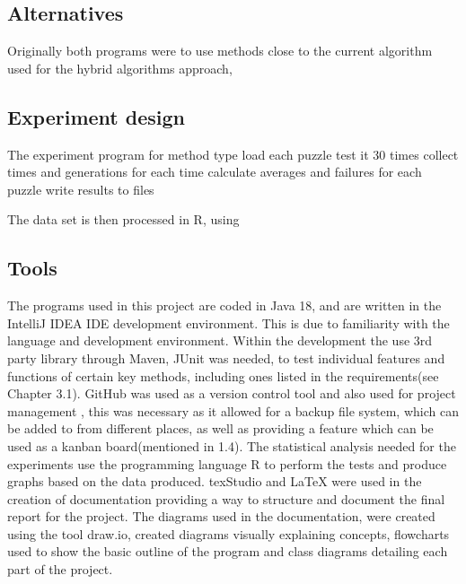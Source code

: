 \documentclass[a4paper,11pt]{article}
\begin{document}
\subsection{Alternatives}
Originally both programs were to use methods close to the current algorithm used for the hybrid algorithms approach,
\subsection{Experiment design}
The experiment program  
for method type
load each puzzle
test it 30 times collect times and generations for each time
calculate averages and failures for each puzzle
write results to files

The data set is then processed in R, using 
\subsection{Tools}
The programs used in this project are coded in Java 18, and are written in the IntelliJ IDEA IDE development environment. This is due to familiarity with the language and development environment. Within the development the use 3rd party library through Maven, JUnit was needed, to test individual features and functions of certain key methods, including ones listed in the requirements(see Chapter 3.1). GitHub was used as a version control tool and also used for project management , this was necessary as it allowed for a backup file system, which can be added to from different places, as well as providing a feature which can be used as a kanban board(mentioned in 1.4).
The statistical analysis needed for the experiments use the programming language R to perform the tests and produce graphs based on the data produced. texStudio and LaTeX were used in the creation of documentation providing a way to structure and document the final report for the project. The diagrams used in the documentation, were created using the tool draw.io, created diagrams visually explaining concepts, flowcharts used to show the basic outline of the program and class diagrams detailing each part of the project. 
\end{document}
